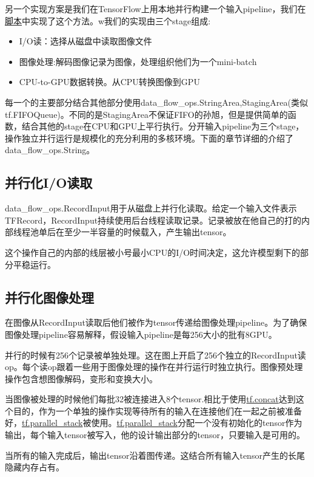另一个实现方案是我们在TensorFlow上用本地并行构建一个输入pipeline，我们在 \href{https://github.com/tensorflow/benchmarks/tree/master/scripts/tf_cnn_benchmarks}{脚本}中实现了这个方法。w我们的实现由三个stage组成:
\begin{itemize}
\item I/O读：选择从磁盘中读取图像文件
\item 图像处理:解码图像记录为图像，处理组织他们为一个mini-batch
\item CPU-to-GPU数据转换。从CPU转换图像到GPU
\end{itemize}
每一个的主要部分结合其他部分使用data\_flow\_ops.StringArea,StagingArea(类似tf.FIFOQueue)。不同的是StagingArea不保证FIFO的孙旭，但是提供简单的函数，结合其他的stage在CPU和GPU上平行执行。分开输入pipeline为三个stage，操作独立并行运行是规模化的充分利用的多核环境。下面的章节详细的介绍了data\_flow\_ops.String。
\subsection{并行化I/O读取}
data\_flow\_ops.RecordInput用于从磁盘上并行化读取。给定一个输入文件表示TFRecord，RecordInput持续使用后台线程读取记录。记录被放在他自己的打的内部线程池单后在至少一半容量的时候载入，产生输出tensor。

这个操作自己的内部的线层被小号最小CPU的I/O时间决定，这允许模型剩下的部分平稳运行。

\subsection{并行化图像处理}
在图像从RecordInput读取后他们被作为tensor传递给图像处理pipeline。为了确保图像处理pipeline容易解释，假设输入pipeline是每256大小的批有8GPU。

并行的时候有256个记录被单独处理。这在图上开启了256个独立的RecordInput读op。每个读op跟着一些用于图像处理的操作在并行运行时独立执行。图像预处理操作包含想图像解码，变形和变换大小。

当图像被处理的时候他们每批32被连接进入8个tensor.相比于使用\href{https://www.tensorflow.org/api_docs/python/tf/concat}{tf.concat}达到这个目的，作为一个单独的操作实现等待所有的输入在连接他们在一起之前被准备好，\href{https://www.tensorflow.org/api_docs/python/tf/parallel_stack}{tf.parallel\_stack}被使用。\href{https://www.tensorflow.org/api_docs/python/tf/parallel_stack}{tf.parallel\_stack}分配一个没有初始化的tensor作为输出，每个输入tensor被写入，他的设计输出部分的tensor，只要输入是可用的。

当所有的输入完成后，输出tensor沿着图传递。这结合所有输入tensor产生的长尾隐藏内存占有。


